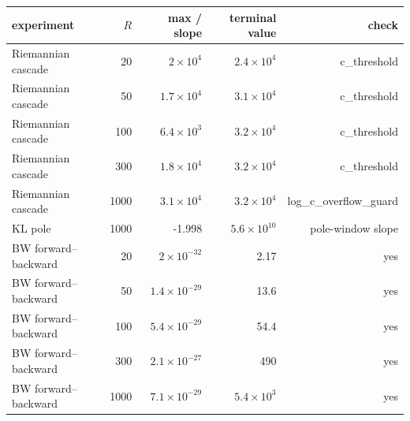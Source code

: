 \begin{tabular}{lrrrr}
\toprule
experiment & $R$ & max / slope & terminal value & check \\
\midrule
Riemannian cascade & 20 & $2\times10^{4}$ & $2.4\times10^{4}$ & c\_threshold \\
Riemannian cascade & 50 & $1.7\times10^{4}$ & $3.1\times10^{4}$ & c\_threshold \\
Riemannian cascade & 100 & $6.4\times10^{3}$ & $3.2\times10^{4}$ & c\_threshold \\
Riemannian cascade & 300 & $1.8\times10^{4}$ & $3.2\times10^{4}$ & c\_threshold \\
Riemannian cascade & 1000 & $3.1\times10^{4}$ & $3.2\times10^{4}$ & log\_c\_overflow\_guard \\
\midrule
KL pole & 1000 & -1.998 & $5.6\times10^{10}$ & pole-window slope \\
\midrule
BW forward--backward & 20 & $2\times10^{-32}$ & 2.17 & yes \\
BW forward--backward & 50 & $1.4\times10^{-29}$ & 13.6 & yes \\
BW forward--backward & 100 & $5.4\times10^{-29}$ & 54.4 & yes \\
BW forward--backward & 300 & $2.1\times10^{-27}$ & 490 & yes \\
BW forward--backward & 1000 & $7.1\times10^{-29}$ & $5.4\times10^{3}$ & yes \\
\bottomrule
\end{tabular}
